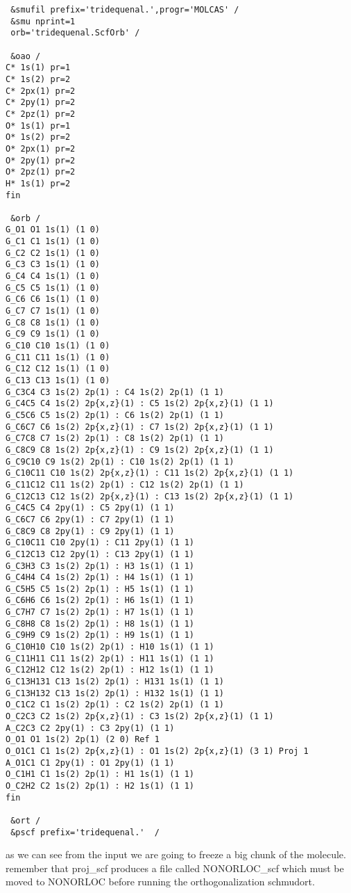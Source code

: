 \documentclass[11pt,a4paper]{article}
\begin{document}
\begin{verbatim}
 &smufil prefix='tridequenal.',progr='MOLCAS' /
 &smu nprint=1
 orb='tridequenal.ScfOrb' /

 &oao /
C* 1s(1) pr=1
C* 1s(2) pr=2
C* 2px(1) pr=2
C* 2py(1) pr=2
C* 2pz(1) pr=2
O* 1s(1) pr=1
O* 1s(2) pr=2
O* 2px(1) pr=2
O* 2py(1) pr=2
O* 2pz(1) pr=2
H* 1s(1) pr=2
fin

 &orb /
G_O1 O1 1s(1) (1 0)
G_C1 C1 1s(1) (1 0)
G_C2 C2 1s(1) (1 0)
G_C3 C3 1s(1) (1 0)
G_C4 C4 1s(1) (1 0)
G_C5 C5 1s(1) (1 0)
G_C6 C6 1s(1) (1 0)
G_C7 C7 1s(1) (1 0)
G_C8 C8 1s(1) (1 0)
G_C9 C9 1s(1) (1 0)
G_C10 C10 1s(1) (1 0)
G_C11 C11 1s(1) (1 0)
G_C12 C12 1s(1) (1 0)
G_C13 C13 1s(1) (1 0)
G_C3C4 C3 1s(2) 2p(1) : C4 1s(2) 2p(1) (1 1)
G_C4C5 C4 1s(2) 2p{x,z}(1) : C5 1s(2) 2p{x,z}(1) (1 1)
G_C5C6 C5 1s(2) 2p(1) : C6 1s(2) 2p(1) (1 1)
G_C6C7 C6 1s(2) 2p{x,z}(1) : C7 1s(2) 2p{x,z}(1) (1 1)
G_C7C8 C7 1s(2) 2p(1) : C8 1s(2) 2p(1) (1 1)
G_C8C9 C8 1s(2) 2p{x,z}(1) : C9 1s(2) 2p{x,z}(1) (1 1)
G_C9C10 C9 1s(2) 2p(1) : C10 1s(2) 2p(1) (1 1)
G_C10C11 C10 1s(2) 2p{x,z}(1) : C11 1s(2) 2p{x,z}(1) (1 1)
G_C11C12 C11 1s(2) 2p(1) : C12 1s(2) 2p(1) (1 1)
G_C12C13 C12 1s(2) 2p{x,z}(1) : C13 1s(2) 2p{x,z}(1) (1 1)
G_C4C5 C4 2py(1) : C5 2py(1) (1 1)
G_C6C7 C6 2py(1) : C7 2py(1) (1 1)
G_C8C9 C8 2py(1) : C9 2py(1) (1 1)
G_C10C11 C10 2py(1) : C11 2py(1) (1 1)
G_C12C13 C12 2py(1) : C13 2py(1) (1 1)
G_C3H3 C3 1s(2) 2p(1) : H3 1s(1) (1 1)
G_C4H4 C4 1s(2) 2p(1) : H4 1s(1) (1 1)
G_C5H5 C5 1s(2) 2p(1) : H5 1s(1) (1 1)
G_C6H6 C6 1s(2) 2p(1) : H6 1s(1) (1 1)
G_C7H7 C7 1s(2) 2p(1) : H7 1s(1) (1 1)
G_C8H8 C8 1s(2) 2p(1) : H8 1s(1) (1 1)
G_C9H9 C9 1s(2) 2p(1) : H9 1s(1) (1 1)
G_C10H10 C10 1s(2) 2p(1) : H10 1s(1) (1 1)
G_C11H11 C11 1s(2) 2p(1) : H11 1s(1) (1 1)
G_C12H12 C12 1s(2) 2p(1) : H12 1s(1) (1 1)
G_C13H131 C13 1s(2) 2p(1) : H131 1s(1) (1 1)
G_C13H132 C13 1s(2) 2p(1) : H132 1s(1) (1 1)
O_C1C2 C1 1s(2) 2p(1) : C2 1s(2) 2p(1) (1 1)
O_C2C3 C2 1s(2) 2p{x,z}(1) : C3 1s(2) 2p{x,z}(1) (1 1)
A_C2C3 C2 2py(1) : C3 2py(1) (1 1)
O_O1 O1 1s(2) 2p(1) (2 0) Ref 1
O_O1C1 C1 1s(2) 2p{x,z}(1) : O1 1s(2) 2p{x,z}(1) (3 1) Proj 1
A_O1C1 C1 2py(1) : O1 2py(1) (1 1)
O_C1H1 C1 1s(2) 2p(1) : H1 1s(1) (1 1)
O_C2H2 C2 1s(2) 2p(1) : H2 1s(1) (1 1)
fin

 &ort /
 &pscf prefix='tridequenal.'  /

\end{verbatim}


as we can see from the input we are going to freeze a big chunk of the
molecule. remember that proj\_scf produces a file called NONORLOC\_scf which
must be moved to NONORLOC before running the orthogonalization schmudort.
\end{document}
